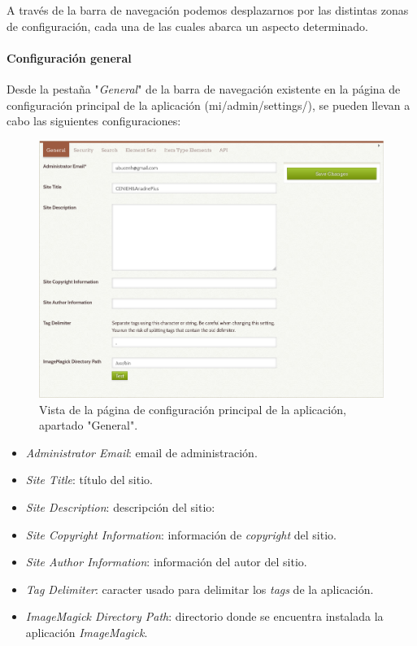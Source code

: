 \documentclass[
]{article}
\providecommand{\tightlist}{%
  \setlength{\itemsep}{0pt}\setlength{\parskip}{0pt}}
\begin{document}
A través de la barra de navegación podemos desplazarnos por las
distintas zonas de configuración, cada una de las cuales abarca un
aspecto determinado.

\hypertarget{configuraciuxf3n-general}{%
\paragraph{Configuración general}\label{configuraciuxf3n-general}}

Desde la pestaña "\emph{General}" de la barra de navegación existente en
la página de configuración principal de la aplicación
({mi/admin/settings/}), se pueden llevan a cabo las siguientes
configuraciones:

\begin{figure}
\hypertarget{settings-general}{%
\centering
\includegraphics{../_static/images/settings-general.png}
\caption{Vista de la página de configuración principal de la aplicación,
apartado "General".}\label{settings-general}
}
\end{figure}

\begin{itemize}
\tightlist
\item
  \emph{Administrator Email}: email de administración.
\item
  \emph{Site Title}: título del sitio.
\item
  \emph{Site Description}: descripción del sitio:
\item
  \emph{Site Copyright Information}: información de \emph{copyright} del
  sitio.
\item
  \emph{Site Author Information}: información del autor del sitio.
\item
  \emph{Tag Delimiter}: caracter usado para delimitar los \emph{tags} de
  la aplicación.
\item
  \emph{ImageMagick Directory Path}: directorio donde se encuentra
  instalada la aplicación \emph{ImageMagick}.
\end{itemize}
\end{document}
